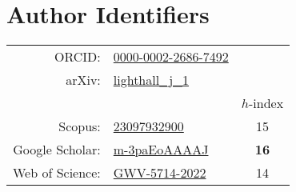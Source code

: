 \section*{Author Identifiers}
\begin{tabular}{r@{ }lc}
ORCID:&\href{https://orcid.org/0000-0002-2686-7492}{0000-0002-2686-7492}\\
arXiv:&\href{https://arxiv.org/a/lighthall_j_1.html}{{lighthall\_j\_1}}\\
&&$h$-index\\
Scopus:&\href{https://www.scopus.com/authid/detail.uri?authorId=23097932900}{23097932900}&15\\
Google Scholar:&\href{https://scholar.google.com/citations?user=m-3paEoAAAAJ}{m-3paEoAAAAJ}&\textbf{16}\\
Web of Science:&\href{https://www.webofscience.com/wos/author/record/GWV-5714-2022}{GWV-5714-2022}&14\\
\end{tabular}
{}
{}

{}

